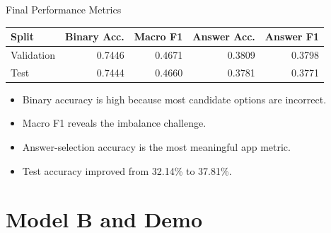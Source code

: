 \documentclass[aspectratio=169,11pt]{beamer}
\begin{document}
\begin{frame}{Final Performance Metrics}
    \begin{table}
        \centering
        \small
        \begin{tabular}{lrrrr}
            \toprule
            \textbf{Split} & \textbf{Binary Acc.} & \textbf{Macro F1} & \textbf{Answer Acc.} & \textbf{Answer F1} \\
            \midrule
            Validation & 0.7446 & 0.4671 & 0.3809 & 0.3798 \\
            Test & 0.7444 & 0.4660 & 0.3781 & 0.3771 \\
            \bottomrule
        \end{tabular}
    \end{table}

    \begin{itemize}
        \item Binary accuracy is high because most candidate options are incorrect.
        \item Macro F1 reveals the imbalance challenge.
        \item Answer-selection accuracy is the most meaningful app metric.
        \item Test accuracy improved from 32.14\% to 37.81\%.
    \end{itemize}
\end{frame}

\section{Model B and Demo}
\end{document}

